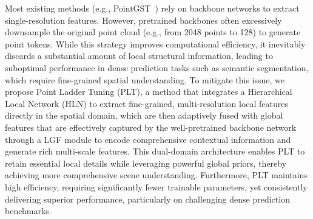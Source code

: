 Most existing methods (e.g., PointGST~\cite{liang2024parameter}) rely on backbone networks to extract single-resolution features. However, pretrained backbones often excessively downsample the original point cloud (e.g., from 2048 points to 128) to generate point tokens. While this strategy improves computational efficiency, it inevitably discards a substantial amount of local structural information, leading to suboptimal performance in dense prediction tasks such as semantic segmentation, which require fine-grained spatial understanding. To mitigate this issue, we propose Point Ladder Tuning (PLT), a method that integrates a Hierarchical Local Network (HLN) to extract fine-grained, multi-resolution local features directly in the spatial domain, which are then adaptively fused with global features that are effectively captured by the well-pretrained backbone network through a LGF module to encode comprehensive contextual information and generate rich multi-scale features. This dual-domain architecture enables PLT to retain essential local details while leveraging powerful global priors, thereby achieving more comprehensive scene understanding. Furthermore, PLT maintains high efficiency, requiring significantly fewer trainable parameters, yet consistently delivering superior performance, particularly on challenging dense prediction benchmarks. %
